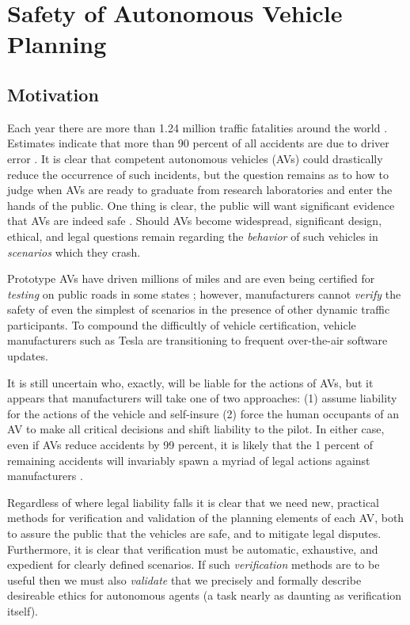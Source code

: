  \section{Safety of Autonomous Vehicle Planning}
 
 \subsection{Motivation}
  Each year there are more than 1.24 million traffic fatalities around the world \cite{Waldrop2015}. Estimates indicate that more than 90 percent of all accidents are due to driver error \cite{Waldrop2015}. It is clear that competent autonomous vehicles (AVs) could drastically reduce the occurrence of such incidents, but the question remains as to how to judge when AVs are ready to graduate from research laboratories and enter the hands of the public. One thing is clear, the public will want significant evidence that AVs are indeed safe \cite{weld1994first}. Should AVs become widespread, significant design, ethical, and legal questions remain regarding the \emph{behavior} of such vehicles in \emph{scenarios} which they crash. 
  
  Prototype AVs have driven millions of miles and are even being certified for \emph{testing} on public roads in some states \cite{Iozzio2014}; however, manufacturers cannot \emph{verify} the safety of even the simplest of scenarios in the presence of other dynamic traffic participants. To compound the difficultly of vehicle certification, vehicle manufacturers such as Tesla are transitioning to frequent over-the-air software updates. 
  
  It is still uncertain who, exactly, will be liable for the actions of AVs, but it appears that manufacturers will take one of two approaches: (1) assume liability for the actions of the vehicle and self-insure \cite{volvo15Liability} (2) force the human occupants of an AV to make all critical decisions and shift liability to the pilot. In either case, even if AVs reduce accidents by 99 percent, it is likely that the 1 percent of remaining accidents will invariably spawn a myriad of legal actions against manufacturers \cite{russell2015research}. 
  
  Regardless of where legal liability falls it is clear that we need new, practical methods for verification and validation of the planning elements of each AV, both to assure the public that the vehicles are safe, and to mitigate legal disputes. Furthermore, it is clear that verification must be automatic, exhaustive, and expedient for clearly defined scenarios. If such \emph{verification} methods are to be useful then we must also \emph{validate} that we precisely and formally describe desireable ethics for autonomous agents (a task nearly as daunting as verification itself).	
 
